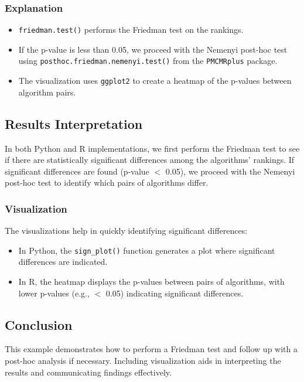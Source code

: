 \documentclass{article}
\begin{document}
\subsubsection*{Explanation}

\begin{itemize}
    \item \texttt{friedman.test()} performs the Friedman test on the rankings.
    \item If the p-value is less than 0.05, we proceed with the Nemenyi post-hoc test using \texttt{posthoc.friedman.nemenyi.test()} from the \texttt{PMCMRplus} package.
    \item The visualization uses \texttt{ggplot2} to create a heatmap of the p-values between algorithm pairs.
\end{itemize}

\subsection*{Results Interpretation}

In both Python and R implementations, we first perform the Friedman test to see if there are statistically significant differences among the algorithms' rankings. If significant differences are found (p-value $<$ 0.05), we proceed with the Nemenyi post-hoc test to identify which pairs of algorithms differ.

\subsubsection*{Visualization}

The visualizations help in quickly identifying significant differences:

\begin{itemize}
    \item In Python, the \texttt{sign\_plot()} function generates a plot where significant differences are indicated.
    \item In R, the heatmap displays the p-values between pairs of algorithms, with lower p-values (e.g., $<$ 0.05) indicating significant differences.
\end{itemize}

\subsection*{Conclusion}

This example demonstrates how to perform a Friedman test and follow up with a post-hoc analysis if necessary. Including visualization aids in interpreting the results and communicating findings effectively.
\end{document}
